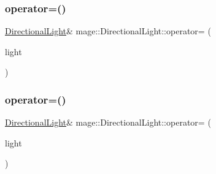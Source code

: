 \subsubsection{\texorpdfstring{operator=()}{operator=()}\hspace{0.1cm}{\footnotesize\ttfamily [1/2]}}
{\footnotesize\ttfamily \hyperlink{classmage_1_1_directional_light}{Directional\+Light}\& mage\+::\+Directional\+Light\+::operator= (\begin{DoxyParamCaption}\item[{const \hyperlink{classmage_1_1_directional_light}{Directional\+Light} \&}]{light }\end{DoxyParamCaption})\hspace{0.3cm}{\ttfamily [delete]}}

\hypertarget{classmage_1_1_directional_light_a7076a654314a40f873f0f0d1e411845f}{}\label{classmage_1_1_directional_light_a7076a654314a40f873f0f0d1e411845f} 
\subsubsection{\texorpdfstring{operator=()}{operator=()}\hspace{0.1cm}{\footnotesize\ttfamily [2/2]}}
{\footnotesize\ttfamily \hyperlink{classmage_1_1_directional_light}{Directional\+Light}\& mage\+::\+Directional\+Light\+::operator= (\begin{DoxyParamCaption}\item[{\hyperlink{classmage_1_1_directional_light}{Directional\+Light} \&\&}]{light }\end{DoxyParamCaption})\hspace{0.3cm}{\ttfamily [delete]}}

